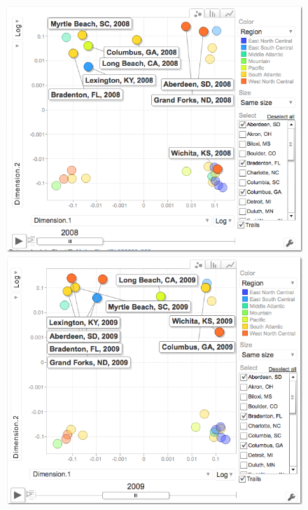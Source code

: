 \documentclass[11pt]{asaproc}
\begin{document}
\begin{figure}[H]
\begin{framed}
\begin{minipage}[b]{0.45\linewidth}
\centering
\includegraphics[width=\textwidth]{mdsproportions08.png}
\end{minipage}
\hspace{0.5cm}
\begin{minipage}[b]{0.45\linewidth}
\centering
\includegraphics[width=\textwidth]{mdsproportions09.png}
\end{minipage}

\end{framed}
\end{figure}
\end{document}
